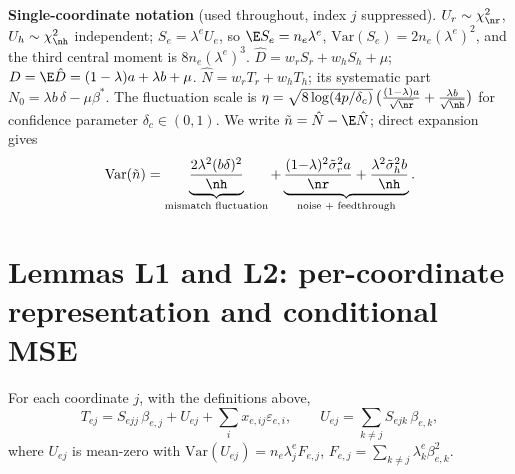\medskip
\noindent\textbf{Single-coordinate notation} (used throughout, index $j$ suppressed).
$U_r \sim \chi^2_{\nr}$, $U_h \sim \chi^2_{\nh}$ independent; $S_e = \lambda^e U_e$, so $\E S_e = n_e\lambda^e$, $\mathrm{Var}(S_e) = 2n_e(\lambda^e)^2$, and the third central moment is $8n_e(\lambda^e)^3$.
$\hat D = w_r S_r + w_h S_h + \mu$; $D = \E\hat D = (1-\lambda)a + \lambda b + \mu$.
$\hat N = w_r T_{r} + w_h T_{h}$; its systematic part $N_0 = \lambda b\,\delta - \mu\beta^*$.
The fluctuation scale is $\eta = \sqrt{8\log(4p/\delta_c)}\,\big(\frac{(1-\lambda)a}{\sqrt{\nr}} + \frac{\lambda b}{\sqrt{\nh}}\big)$ for confidence parameter $\delta_c \in (0,1)$.
We write $\tilde n = \hat N - \E\hat N$; direct expansion gives
\begin{equation}
  \mathrm{Var}(\tilde n) = \underbrace{\frac{2\lambda^2 (b\delta)^2}{\nh}}_{\text{mismatch fluctuation}} + \underbrace{\frac{(1{-}\lambda)^2 \tilde\sigma_r^2 a}{\nr} + \frac{\lambda^2 \tilde\sigma_h^2 b}{\nh}}_{\text{noise + feedthrough}} .
  \label{supp:eq:varn}
\end{equation}

\section{Lemmas L1 and L2: per-coordinate representation and conditional MSE}
\label{supp:l12}

\begin{lemma}[L1, representation]\label{supp:l1}
For each coordinate $j$, with the definitions above,
\begin{equation}
  T_{ej} = S_{ejj}\,\beta_{e,j} + U_{ej} + \textstyle\sum_i x_{e,ij}\varepsilon_{e,i},
  \qquad U_{ej} = \sum_{k\neq j} S_{ejk}\,\beta_{e,k},
  \label{supp:eq:l1}
\end{equation}
where $U_{ej}$ is mean-zero with $\mathrm{Var}(U_{ej}) = n_e \lambda^e_j F_{e,j}$, $F_{e,j} = \sum_{k\neq j} \lambda^e_k \beta_{e,k}^2$.
\end{lemma}

